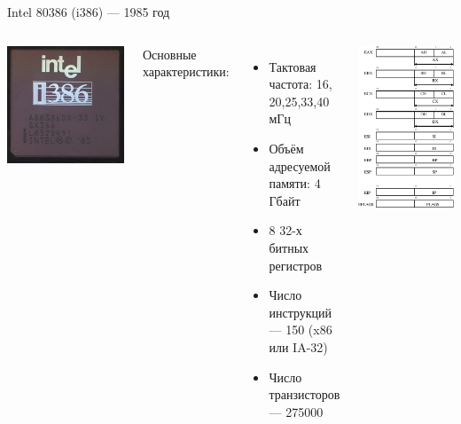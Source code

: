\documentclass{beamer}
\begin{document}
    \begin{frame}{Intel 80386 (i386) --- 1985 год}
    \begin{columns}
    	\includegraphics[width=0.7\linewidth]{fig/i386.png}
    	\footnotesize

    	Основные характеристики:
    	\begin{itemize}
    		\item Тактовая частота: 16, 20,25,33,40 мГц
    		\item Объём адресуемой памяти: 4 Гбайт
    		\item 8 32-х битных регистров
    		\item Число инструкций --- 150 (x86 или IA-32)
    		\item Число транзисторов --- 275000
    	\end{itemize}
    		\includegraphics[width=0.7\linewidth]{fig/x86_regs.pdf}


\end{columns}
\end{frame}
\end{document}
